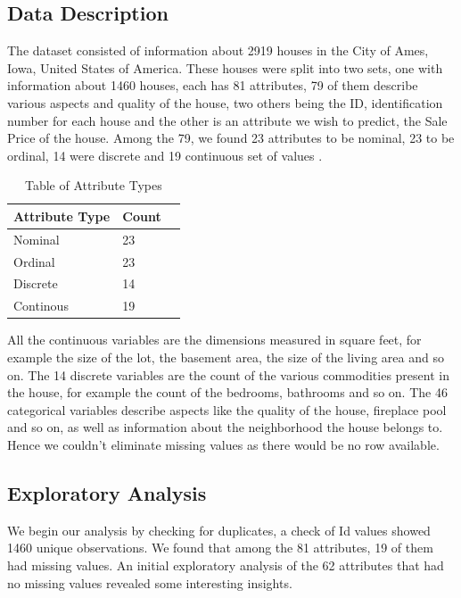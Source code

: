 \documentclass[fleqn,10pt]{SelfArx} %
\begin{document}
	\subsection{Data Description}
	The dataset consisted of information about 2919 houses in the City of Ames, Iowa, United States of America. These houses were split into two sets, one  with information about 1460 houses, each has 81 attributes, 79 of them describe various aspects and quality of the house, two others being the ID, identification number for each house and the other is an attribute we wish to predict, the Sale Price of the house. Among the 79, we found 23 attributes to be nominal, 23 to be ordinal, 14 were discrete and 19 continuous set of values \cite{dataset}.\\
	
	\begin{table}[hbt]
		\caption{Table of Attribute Types}
		\centering
		\begin{tabular}{llr}
			\cmidrule(r){1-2}
			Attribute Type & Count \\
			\midrule
			Nominal & 23 \\
			Ordinal & 23 \\
			Discrete & 14 \\
			Continous & 19
		\end{tabular}
		\label{tab:label}
	\end{table}
	
	All the continuous variables are the dimensions measured in square feet, for example the size of the lot, the basement area, the size of the living area and so on. The 14 discrete variables are the count of the various commodities present in the house, for example the count of the bedrooms, bathrooms and so on. The 46 categorical variables describe aspects like the quality of the house, fireplace pool and so on, as well as information about the neighborhood the house belongs to. Hence we couldn't eliminate missing values as there would be no row available.\\
	
	\subsection{Exploratory Analysis}
	We begin our analysis by checking for duplicates, a check of Id values showed 1460 unique observations. We found that among the 81 attributes, 19 of them had missing values. An initial exploratory analysis of the 62 attributes that had no missing values revealed some interesting insights. \\
	
\end{document}
